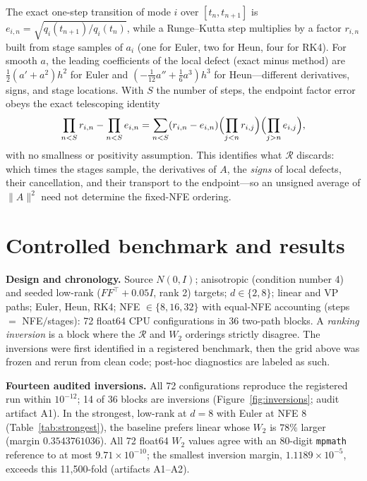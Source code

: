 \documentclass{article}
\newcommand{\wtwo}{W_2}
\newcommand{\artifact}[1]{\textsf{\small #1}}
\begin{document}
The exact one-step transition of mode $i$ over $[t_n,t_{n+1}]$ is
$e_{i,n}=\sqrt{q_i(t_{n+1})/q_i(t_n)}$, while a Runge--Kutta step
multiplies by a factor $r_{i,n}$ built from stage samples of $a_i$ (one for
Euler, two for Heun, four for RK4). For smooth $a$, the leading coefficients
of the local defect (exact minus method) are $\tfrac12(a'+a^2)h^2$ for Euler
and $(-\tfrac1{12}a''+\tfrac16a^3)h^3$ for Heun---different derivatives, signs,
and stage locations. With $S$ the number of steps, the endpoint factor error
obeys the exact telescoping identity
\begin{equation}
  \prod_{n<S}r_{i,n}-\prod_{n<S}e_{i,n}
  =\sum_{n<S}(r_{i,n}-e_{i,n})
  \Bigl(\prod_{j<n}r_{i,j}\Bigr)\Bigl(\prod_{j>n}e_{i,j}\Bigr),
  \label{eq:telescope}
\end{equation}
with no smallness or positivity assumption. This identifies what
$\mathcal{R}$ discards: which times the stages sample, the derivatives
of $A$, the \emph{signs} of local defects, their cancellation, and their
transport to the endpoint---so an unsigned average of $\|A\|^2$ need not
determine the fixed-NFE ordering.

\section{Controlled benchmark and results}
\label{sec:results}

\textbf{Design and chronology.} Source $N(0,I)$; anisotropic (condition
number 4) and seeded low-rank ($FF^{\top}{+}0.05I$, rank 2) targets;
$d\in\{2,8\}$; linear and VP paths; Euler, Heun, RK4; NFE
$\in\{8,16,32\}$ with equal-NFE accounting (steps $=$ NFE$/$stages): 72
float64 CPU configurations in 36 two-path blocks. A \emph{ranking
inversion} is a block where the $\mathcal{R}$ and $\wtwo$ orderings
strictly disagree. The inversions were first identified in a registered
benchmark, then the grid above was frozen and rerun from clean code;
post-hoc diagnostics are labeled as such.

\textbf{Fourteen audited inversions.} All 72 configurations reproduce
the registered run within $10^{-12}$; 14 of 36 blocks are inversions
(Figure~\ref{fig:inversions}; audit artifact \artifact{A1}). In the
strongest, low-rank at $d=8$ with Euler at NFE 8
(Table~\ref{tab:strongest}), the baseline prefers linear whose $\wtwo$
is $78\%$ larger (margin $0.3543761036$). All 72 float64 $\wtwo$ values
agree with an 80-digit \texttt{mpmath} reference to at most
$9.71\times10^{-10}$; the smallest inversion margin,
$1.1189\times10^{-5}$, exceeds this 11{,}500-fold (artifacts
\artifact{A1}--\artifact{A2}).
\end{document}
